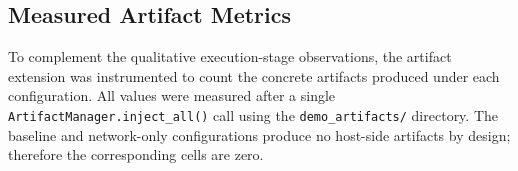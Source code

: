 




\subsection{Measured Artifact Metrics}
\label{sec:artifact-metrics}
To complement the qualitative execution-stage observations, the artifact
extension was instrumented to count the concrete artifacts produced under
each configuration. All values were measured after a single
\texttt{ArtifactManager.inject\_all()} call using the
\texttt{demo\_artifacts/} directory. The baseline and
network-only configurations produce no host-side artifacts by design;
therefore the corresponding cells are zero.

